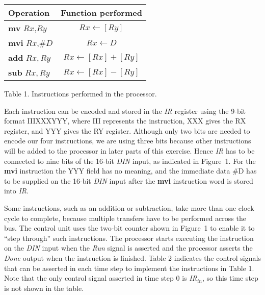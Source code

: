 \documentclass[epsfig,10pt,fullpage]{article}
\begin{document}
\begin{center}
\begin{tabular}{l|c}
\rule[-0.075in]{0in}{0.25in}Operation & Function performed \\ \hline 
\rule[-0.075in]{0in}{0.25in}{\bf mv} $Rx$,$Ry$ & $Rx \leftarrow [Ry]$ \\ 
\rule[-0.075in]{0in}{0.25in}{\bf mvi} $Rx$,\#$D$ & $Rx \leftarrow D$ \\ 
\rule[-0.075in]{0in}{0.25in}{\bf add} $Rx,Ry$ & $Rx \leftarrow [Rx] + [Ry]$ \\ 
\rule[-0.075in]{0in}{0.25in}{\bf sub} $Rx,Ry$ & $Rx \leftarrow [Rx] - [Ry]$ \\ 
\end{tabular}
\end{center}

\begin{center}
Table 1. Instructions performed in the processor.
\end{center}

Each instruction can be encoded and stored in the {\it IR} register using the 9-bit format 
IIIXXXYYY, where III represents the instruction, XXX gives the RX register, and YYY
gives the RY register. Although only two bits are needed to encode our four
instructions, we are using three bits because other instructions will be added to the
processor in later parts of this exercise. Hence {\it IR} has to be connected to nine bits of the 
16-bit {\it DIN} input, as indicated in Figure~1.
For the {\bf mvi} instruction the YYY field has no meaning, and the immediate data \#D has to be
supplied on the 16-bit {\it DIN} input after the {\bf mvi} instruction word is stored into {\it IR}.

Some instructions, such as an addition or subtraction, take more than one clock cycle to
complete, because multiple transfers have to be performed across the bus. The control unit uses 
the two-bit counter shown in Figure~1 to enable it to ``step through'' such instructions.
The processor starts executing the instruction on the {\it DIN} input when the {\it Run}
signal is asserted 
and the processor asserts the {\it Done} output when the instruction is finished.
Table 2 indicates the control signals that can be asserted in each time step to implement
the instructions in Table 1. Note that the only control signal asserted in time step 0 is
{\it IR}$_{in}$, so this time step is not shown in the table.
\end{document}
